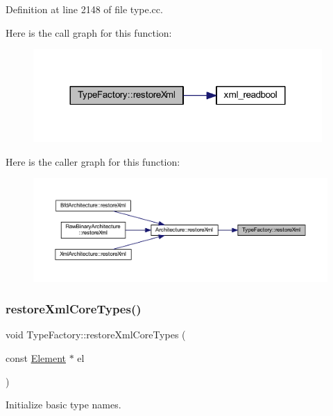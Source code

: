 Definition at line 2148 of file type.\+cc.

Here is the call graph for this function\+:
\nopagebreak
\begin{figure}[H]
\begin{center}
\leavevmode
\includegraphics[width=312pt]{class_type_factory_af9a16d80bfd84732a8dca11ed4a23fab_cgraph}
\end{center}
\end{figure}
Here is the caller graph for this function\+:
\nopagebreak
\begin{figure}[H]
\begin{center}
\leavevmode
\includegraphics[width=350pt]{class_type_factory_af9a16d80bfd84732a8dca11ed4a23fab_icgraph}
\end{center}
\end{figure}
\mbox{\label{class_type_factory_a24c7308dab804e4f89fd567500b97d63}} 
\subsubsection{\texorpdfstring{restoreXmlCoreTypes()}{restoreXmlCoreTypes()}}
{\footnotesize\ttfamily void Type\+Factory\+::restore\+Xml\+Core\+Types (\begin{DoxyParamCaption}\item[{const \mbox{\hyperlink{class_element}{Element}} $\ast$}]{el }\end{DoxyParamCaption})}



Initialize basic type names. 


